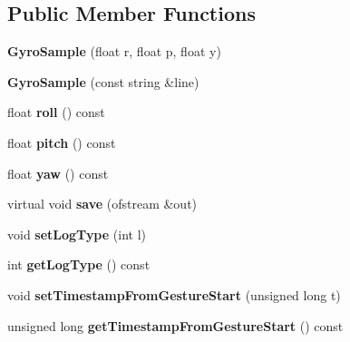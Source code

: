 \subsection*{Public Member Functions}
\begin{DoxyCompactItemize}
\item 
\hypertarget{class_gyro_sample_a5f2b3297cf53498936c2c8fc55b8653b}{{\bfseries Gyro\-Sample} (float r, float p, float y)}\label{class_gyro_sample_a5f2b3297cf53498936c2c8fc55b8653b}

\item 
\hypertarget{class_gyro_sample_ab6010043e58217035a655ccbcf8b3d70}{{\bfseries Gyro\-Sample} (const string \&line)}\label{class_gyro_sample_ab6010043e58217035a655ccbcf8b3d70}

\item 
\hypertarget{class_gyro_sample_a8360f35fbf6fd9e46f25be49f6fc92cd}{float {\bfseries roll} () const }\label{class_gyro_sample_a8360f35fbf6fd9e46f25be49f6fc92cd}

\item 
\hypertarget{class_gyro_sample_a524cde9a9313320cbcf3e9cb6cb4894e}{float {\bfseries pitch} () const }\label{class_gyro_sample_a524cde9a9313320cbcf3e9cb6cb4894e}

\item 
\hypertarget{class_gyro_sample_a6dcbb6633450bff4f6d322c8b4e3ca06}{float {\bfseries yaw} () const }\label{class_gyro_sample_a6dcbb6633450bff4f6d322c8b4e3ca06}

\item 
\hypertarget{class_gyro_sample_a2f8571fe6f29fc4e28ea582ff9f0cfa7}{virtual void {\bfseries save} (ofstream \&out)}\label{class_gyro_sample_a2f8571fe6f29fc4e28ea582ff9f0cfa7}

\item 
\hypertarget{class_sample_ae728243bef5e290d46a2851ea2ce5fe2}{void {\bfseries set\-Log\-Type} (int l)}\label{class_sample_ae728243bef5e290d46a2851ea2ce5fe2}

\item 
\hypertarget{class_sample_aafff0e8223f3eafa001611a63f194c8a}{int {\bfseries get\-Log\-Type} () const }\label{class_sample_aafff0e8223f3eafa001611a63f194c8a}

\item 
\hypertarget{class_sample_a05edd06782fa94517b8daeb29e12057d}{void {\bfseries set\-Timestamp\-From\-Gesture\-Start} (unsigned long t)}\label{class_sample_a05edd06782fa94517b8daeb29e12057d}

\item 
\hypertarget{class_sample_a94a34fe92c0f8a89485042aaea458d94}{unsigned long {\bfseries get\-Timestamp\-From\-Gesture\-Start} () const }\label{class_sample_a94a34fe92c0f8a89485042aaea458d94}

\end{DoxyCompactItemize}

